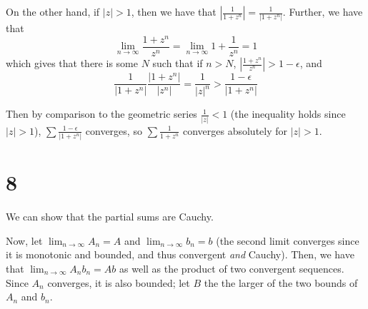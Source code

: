 \documentclass[12pt,letterpaper]{article}
\theoremstyle{definition}
\begin{document}
On the other hand, if $|z| > 1$, then we have that $\left|\frac{1}{1+z^{n}}\right| = \frac{1}{|1 + z^{n}|}$. Further, we have that
\[
  \lim_{n \rightarrow \infty}\frac{1 + z^{n}}{z^{n}} = \lim_{n \rightarrow \infty}1 + \frac{1}{z^{n}} = 1
\]
which gives that there is some $N$ such that if $n > N$, $\left|\frac{1 + z^{n}}{z^{n}}\right| > 1 - \epsilon$, and
\[
  \frac{1}{|1 + z^{n}|}\frac{|1 + z^{n}|}{|z^{n}|} = \frac{1}{|z|^{n}} > \frac{1-\epsilon}{|1 + z^{n}|}
\]

Then by comparison to the geometric series $\frac{1}{|z|} < 1$ (the inequality holds since $|z| > 1$), $\sum \frac{1-\epsilon}{|1+z^{n}|}$ converges, so $\sum \frac{1}{1 + z^{n}}$ converges absolutely for $|z| > 1$.

\section*{8}

We can show that the partial sums are Cauchy.

Now, let $\lim_{n \rightarrow \infty}A_{n} = A$ and $\lim_{n \rightarrow \infty} b_{n} = b$ (the second limit converges since it is monotonic and bounded, and thus convergent \textit{and} Cauchy). Then, we have that $\lim_{n \rightarrow \infty}A_{n}b_{n} = Ab$ as well as the product of two convergent sequences. Since $A_{n}$ converges, it is also bounded; let $B$ the the larger of the two bounds of $A_{n}$ and $b_{n}$.
\end{document}
